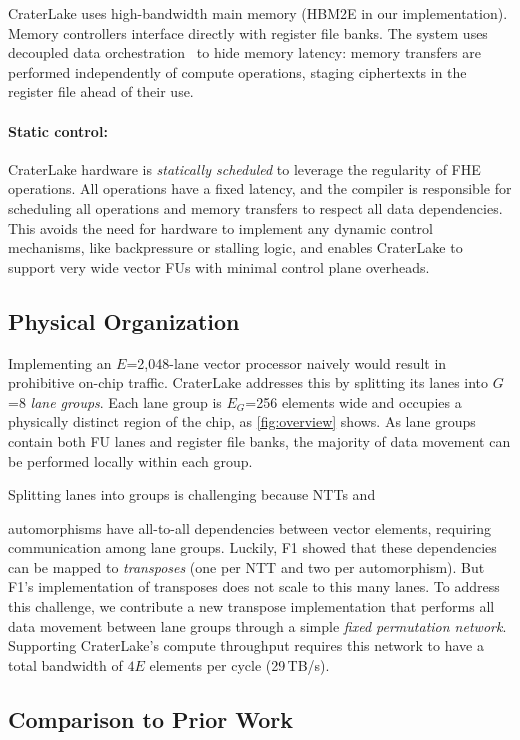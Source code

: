 CraterLake uses high-bandwidth main memory (HBM2E in our implementation).
Memory controllers interface directly with register file banks. The system uses
decoupled data orchestration~\cite{pellauer:asplos19:buffets} to hide memory
latency: memory transfers are performed independently of compute operations,
staging ciphertexts in the register file ahead of their use.

\paragraph{Static control:}
CraterLake hardware is \emph{statically scheduled} to leverage the regularity
of FHE operations. All operations have a fixed latency, and the compiler is
responsible for scheduling all operations and memory transfers to respect all
data dependencies. This avoids the need for hardware to implement any dynamic
control mechanisms, like backpressure or stalling logic, and enables CraterLake
to support very wide vector FUs with minimal control plane overheads.

\subsection{Physical Organization}
\label{sec:tiling}
Implementing an $E$=2,048-lane vector processor naively would result in
prohibitive on-chip traffic. CraterLake addresses this by splitting its lanes
into $G$=8 \emph{lane groups}. Each lane group is $E_G$=256 elements wide and
occupies a physically distinct region of the chip, as \autoref{fig:overview}
shows. As lane groups contain both FU lanes and register file banks, the
majority of data movement can be performed locally within each group.

Splitting lanes into groups is challenging because NTTs and

\noindent automorphisms have all-to-all dependencies between vector elements,
requiring communication among lane groups. Luckily, F1 showed that these
dependencies can be mapped to \emph{transposes} (one per NTT and two per
automorphism). But F1's implementation of transposes does not scale to this
many lanes. To address this challenge, we contribute a new transpose
implementation that performs all data movement between lane groups through a
simple \emph{fixed permutation network}. Supporting CraterLake's compute throughput
requires this network to have a total bandwidth of $4E$ elements per cycle
(29\,TB/s).

\subsection{Comparison to Prior Work}
\label{sec:comparison}

